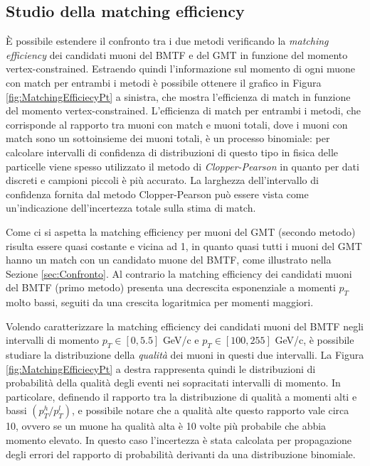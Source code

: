 \subsection{Studio della matching efficiency}
\label{sec:MatchingEfficiency}

È possibile estendere il confronto tra i due metodi verificando la \textit{matching efficiency} dei candidati muoni del BMTF e del GMT in funzione del momento vertex-constrained. Estraendo quindi l'informazione sul momento di ogni muone con match per entrambi i metodi è possibile ottenere il grafico in Figura \ref{fig:MatchingEfficiecyPt} a sinistra, che mostra l'efficienza di match in funzione del momento vertex-constrained. 
L'efficienza di match per entrambi i metodi, che corrisponde al rapporto tra muoni con match e muoni totali, dove i muoni con match sono un sottoinsieme dei muoni totali, è un processo binomiale: per calcolare intervalli di confidenza di distribuzioni di questo tipo in fisica delle particelle viene spesso utilizzato il metodo di \textit{Clopper-Pearson} in quanto per dati discreti e campioni piccoli è più accurato. La larghezza dell’intervallo di confidenza fornita dal metodo Clopper-Pearson può essere vista come un’indicazione dell’incertezza totale sulla stima di match.

Come ci si aspetta la matching efficiency per muoni del GMT (secondo metodo) risulta essere quasi costante e vicina ad 1, in quanto quasi tutti i muoni del GMT hanno un match con un candidato muone del BMTF, come illustrato nella Sezione \ref{sec:Confronto}. \newline
Al contrario la matching efficiency dei candidati muoni del BMTF (primo metodo) presenta una decrescita esponenziale a momenti $p_T$ molto bassi, seguiti da una crescita logaritmica per momenti maggiori. 

Volendo caratterizzare la matching efficiency dei candidati muoni del BMTF negli intervalli di momento $p_T \in [0, 5.5]$ GeV/c e $p_T \in [100, 255]$ GeV/c, è possibile studiare la distribuzione della \textit{qualità} dei muoni in questi due intervalli. La Figura \ref{fig:MatchingEfficiecyPt} a destra rappresenta quindi le distribuzioni di probabilità della qualità degli eventi nei sopracitati intervalli di momento. In particolare, definendo il rapporto tra la distribuzione di qualità a momenti alti e bassi $\left(p_T^h / p_T^l\right)$, e possibile notare che a qualità alte questo rapporto vale circa 10, ovvero se un muone ha qualità alta è 10 volte più probabile che abbia momento elevato. 
In questo caso l'incertezza è stata calcolata per propagazione degli errori del rapporto di probabilità derivanti da una distribuzione binomiale.






